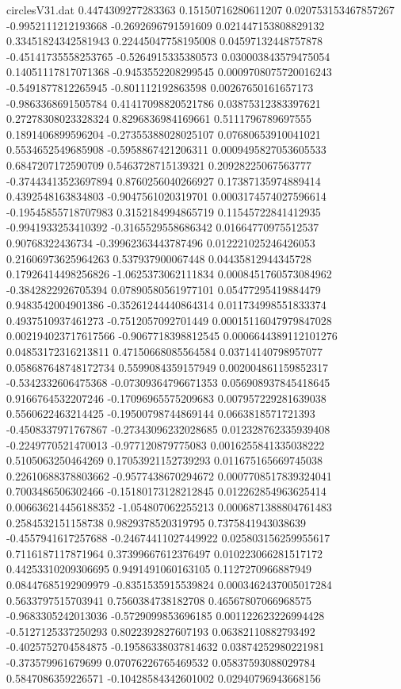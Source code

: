 \begin{filecontents}{circlesV31.dat}
0.4474309277283363	0.15150716280611207	0.020753153467857267
-0.9952111212193668	-0.2692696791591609	0.021447153808829132
0.33451824342581943	0.22445047758195008	0.04597132448757878
-0.45141735558253765	-0.5264915335380573	0.030003843579475054
0.14051117817071368	-0.9453552208299545	0.0009708075720016243
-0.5491877812265945	-0.801112192863598	0.00267650161657173
-0.9863368691505784	0.41417098820521786	0.03875312383397621
0.27278308023328324	0.8296836984169661	0.5111796789697555
0.1891406899596204	-0.27355388028025107	0.07680653910041021
0.5534652549685908	-0.5958867421206311	0.0009495827053605533
0.6847207172590709	0.5463728715139321	0.20928225067563777
-0.37443413523697894	0.8760256040266927	0.17387135974889414
0.4392548163834803	-0.9047561020319701	0.0003174574027596614
-0.19545855718707983	0.3152184994865719	0.11545722841412935
-0.9941933253410392	-0.3165529558686342	0.01664770975512537
0.90768322436734	-0.39962363443787496	0.012221025246426053
0.21606973625964263	0.537937900067448	0.04435812944345728
0.17926414498256826	-1.0625373062111834	0.0008451760573084962
-0.3842822926705394	0.07890580561977101	0.05477295419884479
0.9483542004901386	-0.35261244440864314	0.011734998551833374
0.4937510937461273	-0.7512057092701449	0.00015116047979847028
0.002194023717617566	-0.9067718398812545	0.0006644389112101276
0.04853172316213811	0.47150668085564584	0.03714140798957077
0.058687648748172734	0.5599084359157949	0.002004861159852317
-0.5342332606475368	-0.07309364796671353	0.056908937845418645
0.9166764532207246	-0.17096965575209683	0.007957229281639038
0.5560622463214425	-0.19500798744869144	0.0663818571721393
-0.4508337971767867	-0.27343096232028685	0.012328762335939408
-0.2249770521470013	-0.977120879775083	0.0016255841335038222
0.5105063250464269	0.17053921152739293	0.011675165669745038
0.22610688378803662	-0.9577438670294672	0.0007708517839324041
0.7003486506302466	-0.15180173128212845	0.012262854963625414
0.006636214456188352	-1.054807062255213	0.0006871388804761483
0.2584532151158738	0.9829378520319795	0.7375841943038639
-0.4557941617257688	-0.24674411027449922	0.025803156259955617
0.7116187117871964	0.37399667612376497	0.010223066281517172
0.44253310209306695	0.9491491060163105	0.1127270966887949
0.08447685192909979	-0.8351535915539824	0.0003462437005017284
0.5633797515703941	0.7560384738182708	0.46567807066968575
-0.9683305242013036	-0.5729099853696185	0.001122623226994428
-0.5127125337250293	0.8022392827607193	0.06382110882793492
-0.4025752704584875	-0.19586338037814632	0.03874252980221981
-0.373579961679699	0.07076226765469532	0.05837593088029784
0.5847086359226571	-0.10428584342601002	0.02940796943668156

\end{filecontents}
